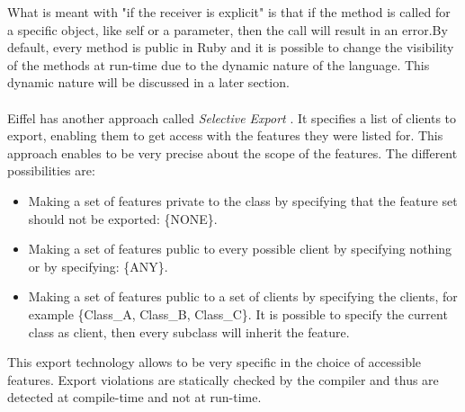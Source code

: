 \documentclass[12pt,a4paper,twocolumn]{article}
\begin{document}
What is meant with "if the receiver is explicit"  is that if the method is called for a specific object, like self or a parameter, then the call will result in an error.By default, every method is public in Ruby and it is possible to change the visibility of the methods at run-time due to the dynamic nature of the language. This dynamic nature will be discussed in a later section.
\\
\\
Eiffel has another approach called \emph{Selective Export}\cite{meyer2001eiffel,accessControlEiffel} . It specifies a list of clients to export, enabling them to get access with the features they were listed for. This approach enables to be very precise about the scope of the features. The different possibilities are:
\begin{itemize}
\item Making a set of features private to the class by specifying that the feature set should not be exported: \{NONE\}.
\item Making a set of features public to every possible client by specifying nothing or by specifying: \{ANY\}.
\item Making a set of features public to a set of clients by specifying the clients, for example \{Class\_A, Class\_B, Class\_C\}. It is possible to specify the current class as client, then every subclass will inherit the feature.
\end{itemize}
This export technology allows to be very specific in the choice of accessible features. Export violations are statically checked by the compiler and thus are detected at compile-time and not at run-time.
\end{document}
